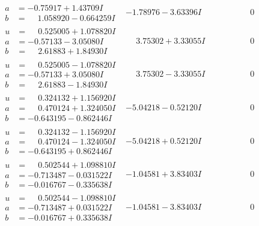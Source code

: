 \documentclass[1p]{elsarticle_modified}
\theoremstyle{definition}
\begin{document}
$$\begin{array}{c|c|c}
\begin{aligned}
a &= -0.75917 + 1.43709 I \\
b &= \phantom{-}1.058920 - 0.664259 I\end{aligned}
 & -1.78976 - 3.63396 I & \phantom{-0.000000 } 0 \\ \hline\begin{aligned}
u &= \phantom{-}0.525005 + 1.078820 I \\
a &= -0.57133 - 3.05080 I \\
b &= \phantom{-}2.61883 + 1.84930 I\end{aligned}
 & \phantom{-}3.75302 + 3.33055 I & \phantom{-0.000000 } 0 \\ \hline\begin{aligned}
u &= \phantom{-}0.525005 - 1.078820 I \\
a &= -0.57133 + 3.05080 I \\
b &= \phantom{-}2.61883 - 1.84930 I\end{aligned}
 & \phantom{-}3.75302 - 3.33055 I & \phantom{-0.000000 } 0 \\ \hline\begin{aligned}
u &= \phantom{-}0.324132 + 1.156920 I \\
a &= \phantom{-}0.470124 + 1.324050 I \\
b &= -0.643195 - 0.862446 I\end{aligned}
 & -5.04218 - 0.52120 I & \phantom{-0.000000 } 0 \\ \hline\begin{aligned}
u &= \phantom{-}0.324132 - 1.156920 I \\
a &= \phantom{-}0.470124 - 1.324050 I \\
b &= -0.643195 + 0.862446 I\end{aligned}
 & -5.04218 + 0.52120 I & \phantom{-0.000000 } 0 \\ \hline\begin{aligned}
u &= \phantom{-}0.502544 + 1.098810 I \\
a &= -0.713487 - 0.031522 I \\
b &= -0.016767 - 0.335638 I\end{aligned}
 & -1.04581 + 3.83403 I & \phantom{-0.000000 } 0 \\ \hline\begin{aligned}
u &= \phantom{-}0.502544 - 1.098810 I \\
a &= -0.713487 + 0.031522 I \\
b &= -0.016767 + 0.335638 I\end{aligned}
 & -1.04581 - 3.83403 I & \phantom{-0.000000 } 0\\

\end{array}$$
\end{document}
